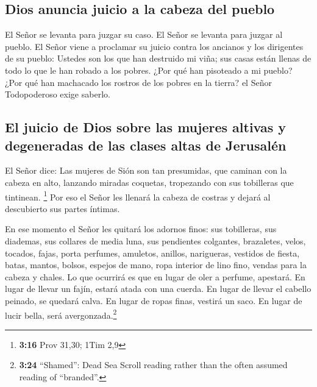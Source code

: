 \hypertarget{dios-anuncia-juicio-a-la-cabeza-del-pueblo}{%
\subsection{Dios anuncia juicio a la cabeza del
pueblo}\label{dios-anuncia-juicio-a-la-cabeza-del-pueblo}}

 El Señor se levanta para juzgar su caso. El Señor se
levanta para juzgar al pueblo.  El Señor viene a
proclamar su juicio contra los ancianos y los dirigentes de su pueblo:
Ustedes son los que han destruido mi viña; sus casas están llenas de
todo lo que le han robado a los pobres.  ¿Por qué han
pisoteado a mi pueblo? ¿Por qué han machacado los rostros de los pobres
en la tierra? el Señor Todopoderoso exige saberlo.

\hypertarget{el-juicio-de-dios-sobre-las-mujeres-altivas-y-degeneradas-de-las-clases-altas-de-jerusaluxe9n}{%
\subsection{El juicio de Dios sobre las mujeres altivas y degeneradas de
las clases altas de
Jerusalén}\label{el-juicio-de-dios-sobre-las-mujeres-altivas-y-degeneradas-de-las-clases-altas-de-jerusaluxe9n}}

 El Señor dice: Las mujeres de Sión son tan presumidas,
que caminan con la cabeza en alto, lanzando miradas coquetas, tropezando
con sus tobilleras que tintinean. \footnote{\textbf{3:16} Prov 31,30;
  1Tim 2,9}  Por eso el Señor les llenará la cabeza de
costras y dejará al descubierto sus partes íntimas.

 En ese momento el Señor les quitará los adornos finos:
sus tobilleras, sus diademas, sus collares de media luna,
 sus pendientes colgantes, brazaletes, velos,
 tocados, fajas, porta perfumes, amuletos,
 anillos, narigueras,  vestidos de fiesta,
batas, mantos, bolsos,  espejos de mano, ropa interior de
lino fino, vendas para la cabeza y chales.  Lo que
ocurrirá es que en lugar de oler a perfume, apestará. En lugar de llevar
un fajín, estará atada con una cuerda. En lugar de llevar el cabello
peinado, se quedará calva. En lugar de ropas finas, vestirá un saco. En
lugar de lucir bella, será avergonzada.\footnote{\textbf{3:24}
  ``Shamed'': Dead Sea Scroll reading rather than the often assumed
  reading of ``branded''.}

